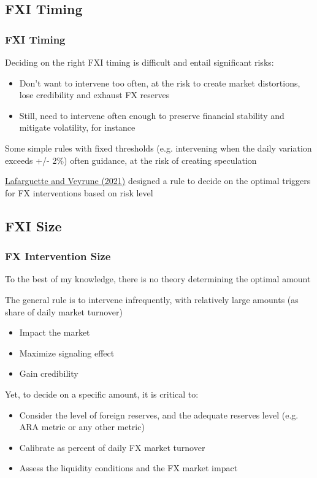 \documentclass{beamer}
\newenvironment{wideitemize}{\itemize\addtolength{\itemsep}{10pt}}{\enditemize}
\begin{document}
\subsection{FXI Timing}
\begin{frame}
  \frametitle{FXI Timing}
  \begin{wideitemize}
  \item Deciding on the right FXI timing is difficult and entail significant risks:
    \begin{itemize}
    \item Don't want to intervene too often, at the risk to create market distortions, lose credibility and exhaust FX reserves
    \item Still, need to intervene often enough to preserve financial stability and mitigate volatility, for instance
    \end{itemize}
  \item Some simple rules with fixed thresholds (e.g. intervening when the daily variation exceeds +/- 2\%) often guidance, at the risk of creating speculation
  \item \href{https://www.imf.org/en/Publications/WP/Issues/2021/02/12/Foreign-Exchange-Intervention-Rules-for-Central-Banks-A-Risk-based-Framework-50081}{Lafarguette and Veyrune (2021)} designed a rule to decide on the optimal triggers for FX interventions based on risk level  
  \end{wideitemize}
\end{frame}


\subsection{FXI Size}

\begin{frame}
  \frametitle{FX Intervention Size}
  \begin{wideitemize}
  \item To the best of my knowledge, there is no theory determining the optimal amount
  \item The general rule is to intervene infrequently, with relatively large amounts (as share of daily market turnover)
    \begin{itemize}
    \item Impact the market
    \item Maximize signaling effect
    \item Gain credibility
    \end{itemize}
  \item Yet, to decide on a specific amount, it is critical to:
    \begin{itemize}
    \item Consider the level of foreign reserves, and the adequate reserves level (e.g. ARA metric or any other metric)
    \item Calibrate as percent of daily FX market turnover
    \item Assess the liquidity conditions and the FX market impact
    \end{itemize}
  \end{wideitemize}
\end{frame}
\end{document}
